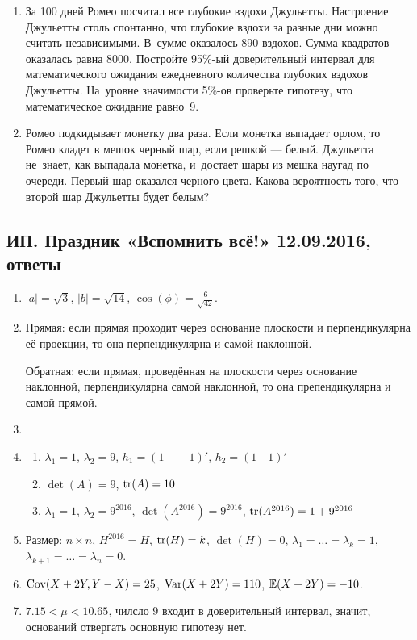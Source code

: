 \documentclass[12pt, a4paper]{article}\usepackage[]{graphicx}\usepackage[]{color}
\begin{document}
\begin{enumerate}
\item За 100 дней Ромео посчитал все глубокие вздохи Джульетты. Настроение Джульетты столь спонтанно, что глубокие вздохи за разные дни можно считать независимыми. В~сумме оказалось 890 вздохов. Сумма квадратов оказалась равна 8000. Постройте 95\%-ый доверительный интервал для математического ожидания ежедневного количества глубоких вздохов Джульетты. На~уровне значимости 5\%-ов проверьте гипотезу, что математическое ожидание равно~9.

\item Ромео подкидывает монетку два раза. Если монетка выпадает орлом, то Ромео кладет в мешок черный шар, если решкой — белый. Джульетта не~знает, как выпадала монетка, и~достает шары из мешка наугад по очереди. Первый шар оказался черного цвета. Какова вероятность того, что второй шар Джульетты будет белым?

\end{enumerate}




\subsection{ИП. Праздник «Вспомнить всё!» 12.09.2016, ответы}

\begin{enumerate}
\item $\lvert a \rvert = \sqrt{3}$, $\lvert b \rvert = \sqrt{14}$, $\cos(\phi) = \frac{6}{\sqrt{42}}$.
\item Прямая: если прямая проходит через основание плоскости и перпендикулярна её проекции, то она перпендикулярна и самой наклонной.

Обратная: если прямая, проведённая на плоскости через основание наклонной, перпендикулярна самой наклонной, то она препендикулярна и самой прямой.
\item
\item
\begin{enumerate}
\item $\lambda_1 = 1$, $\lambda_2 = 9$, $h_1 = (1 \quad -1)'$, $h_2 = (1 \quad 1)'$
\item $\det(A) = 9$, $\operatorname{tr}(A) = 10$
\item $\lambda_1 = 1$, $\lambda_2 = 9^{2016}$, $\det(A^{2016}) = 9^{2016}$, $\operatorname{tr}(A^{2016}) = 1 + 9^{2016}$
\end{enumerate}
\item Размер: $n \times n$, $H^{2016} = H$, $\operatorname{tr}(H) = k$, $\det(H) = 0$, $\lambda_1 = \ldots = \lambda_k = 1$, $\lambda_{k+1} = \ldots = \lambda_{n} = 0$.
\item  $\operatorname{Cov}(X+2Y, Y-X) = 25$, $\operatorname{Var}(X+2Y) = 110$, $\mathbb{E}(X+2Y) = -10$.
\item $7.15 < \mu < 10.65$, чилсло $9$ входит в доверительный интервал, значит, оснований отвергать основную гипотезу нет.
\end{enumerate}
\end{document}
